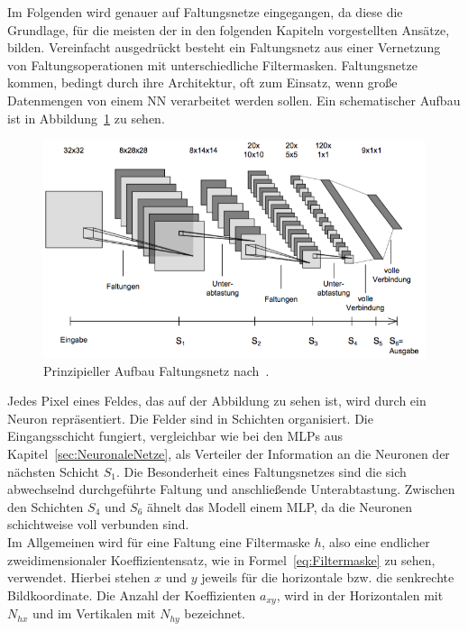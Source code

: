\documentclass[times, 12pt,twocolumn]{article}
\begin{document}
 \label{sec:Faltungsnetze}
Im Folgenden wird genauer auf Faltungsnetze eingegangen, da diese die Grundlage, für die meisten der in den folgenden Kapiteln vorgestellten Ansätze, bilden. Vereinfacht ausgedrückt besteht ein Faltungsnetz aus einer Vernetzung von Faltungsoperationen mit unterschiedliche Filtermasken. Faltungsnetze kommen, bedingt durch ihre Architektur, oft zum Einsatz, wenn große Datenmengen von einem NN verarbeitet werden sollen. Ein schematischer Aufbau ist in Abbildung~\ref{fig:CNN} zu sehen. 

\begin{figure}
	\flushleft
	\includegraphics[width=\columnwidth]{Bilder/structure-cnn.jpg}
	\caption{Prinzipieller Aufbau Faltungsnetz nach~\cite{Osadchy}.}
	\label{fig:CNN}
\end{figure}

Jedes Pixel eines Feldes, das auf der Abbildung zu sehen ist, wird durch ein Neuron repräsentiert. Die Felder sind in Schichten organisiert. Die Eingangsschicht fungiert, vergleichbar wie bei den MLPs aus Kapitel~\ref{sec:NeuronaleNetze}, als Verteiler der Information an die Neuronen der nächsten Schicht $S_1$. Die Besonderheit eines Faltungsnetzes sind die sich abwechselnd durchgeführte Faltung und anschließende Unterabtastung. Zwischen den Schichten $S_4$ und $S_6$ ähnelt das Modell einem MLP, da die Neuronen schichtweise voll verbunden sind.\\

Im Allgemeinen wird für eine Faltung eine Filtermaske $h$, also eine endlicher zweidimensionaler Koeffizientensatz, wie in Formel~\ref{eq:Filtermaske} zu sehen, verwendet. Hierbei stehen $x$ und $y$ jeweils für die horizontale bzw. die senkrechte Bildkoordinate. Die Anzahl der Koeffizienten $a_{xy}$, wird in der Horizontalen mit $N_{hx}$ und im Vertikalen mit $N_{hy}$ bezeichnet. 
\end{document}
